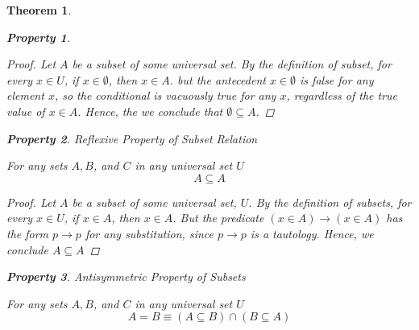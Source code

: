 \documentclass{book}
\newtheorem{theorem}{Theorem}[section]
\newtheorem{property}{Property}[theorem]
\theoremstyle{definition}
\theoremstyle{remark}
\begin{document}
\begin{theorem}
\begin{property}
        \begin{proof}
            Let $A$ be a subset of some universal set. By the definition of subset, for every $x \in U$, if $x \in \emptyset$, then $x \in A$. but the antecedent $x \in \emptyset$ is false for any element $x$, so the conditional is vacuously true for any $x$, regardless of the true value of $x \in A$. Hence, the we conclude that $\emptyset \subseteq A$. 
        \end{proof}
    \end{property}
    
    
    \begin{property}
    Reflexive Property of Subset Relation  \\
        \begin{tcolorbox}
            For any sets $A, B$, and $C$ in any universal set $U$
                \begin{equation*}
                    A \subseteq A
                \end{equation*}
        \end{tcolorbox}
    
        \begin{proof}
            Let $A$ be a subset of some universal set, $U$. By the definition of subsets, for every $x \in U$, if $x \in A$, then $x \in A$. But the predicate $(x \in A) \to (x \in A)$ has the form $p \to p$ for any substitution, since $p \to p$ is a tautology. Hence, we conclude $A \subseteq A$
        \end{proof}
    \end{property}
    
    
    \newpage
    \begin{property}
    Antisymmetric Property of Subsets  \\
        \begin{tcolorbox}
            For any sets $A, B$, and $C$ in any universal set $U$
                \begin{equation*}
                    A = B \equiv (A \subseteq B) \cap (B \subseteq A)
                \end{equation*}
        \end{tcolorbox}
    

\end{property}
\end{theorem}
\end{document}
